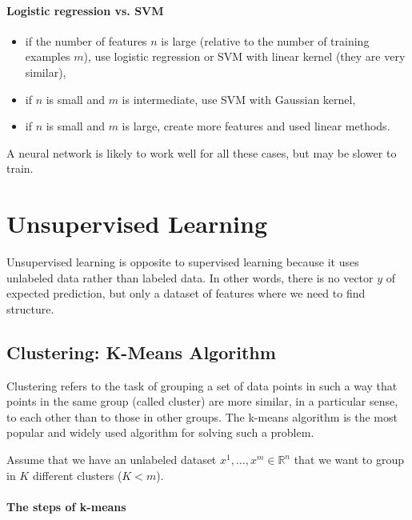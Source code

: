 \documentclass[a4paper,11pt]{report}
\begin{document}
\subsubsection*{Logistic regression vs. SVM}

\begin{itemize}
  \item if the number of features $n$ is large (relative to the number of training examples $m$), use logistic regression or SVM with linear kernel (they are very similar),
  \item if $n$ is small and $m$ is intermediate, use SVM with Gaussian kernel,
  \item if $n$ is small and $m$ is large, create more features and used linear methods.
\end{itemize}

A neural network is likely to work well for all these cases, but may be slower to train.


\chapter{Unsupervised Learning}

Unsupervised learning is opposite to supervised learning because it uses unlabeled data rather than labeled data. In other words, there is no vector $y$ of expected prediction, but only a dataset of features where we need to find structure.

\section{Clustering: K-Means Algorithm}

Clustering refers to the task of grouping a set of data points in such a way that points in the same group (called cluster) are more similar, in a particular sense, to each other than to those in other groups. The k-means algorithm is the most popular and widely used algorithm for solving such a problem.

Assume that we have an unlabeled dataset $x^1, \ldots, x^m \in \mathbb{R}^n$ that we want to group in $K$ different clusters ($K < m$).

\subsubsection*{The steps of k-means}
\end{document}
